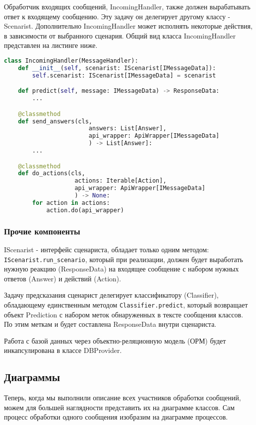     Обработчик входящих сообщений, IncomingHandler, также должен вырабатывать ответ
    к входящему сообщению. Эту задачу он делегирует другому классу - Scenarist.
    Дополнительно IncomingHandler может исполнять некоторые действия,
    в зависимости от выбранного сценария.
    Общий вид класса IncomingHandler представлен на листинге ниже.
\begin{lstlisting}[language=Python]
class IncomingHandler(MessageHandler):
    def __init__(self, scenarist: IScenarist[IMessageData]):
        self.scenarist: IScenarist[IMessageData] = scenarist

    def predict(self, message: IMessageData) -> ResponseData:
        ...

    @classmethod
    def send_answers(cls,
                        answers: List[Answer],
                        api_wrapper: ApiWrapper[IMessageData]
                        ) -> List[Answer]:
        ...

    @classmethod
    def do_actions(cls,
                    actions: Iterable[Action], 
                    api_wrapper: ApiWrapper[IMessageData]
                    ) -> None:
        for action in actions:
            action.do(api_wrapper)
\end{lstlisting}

    \subsubsection*{Прочие компоненты}
    IScenarist - интерфейс сценариста, обладает только одним методом:\\
    \lstinline{IScenarist.run_scenario}, который при реализации, должен будет
    выработать нужную реакцию (ResponseData) на входящее сообщение с набором
    нужных ответов (Answer) и действий (Action).

    Задачу предсказания сценарист делегирует классификатору (Classifier),
    обладающему единственным методом \lstinline{Classifier.predict}, который
    возвращает объект Prediction с набором меток обнаруженных в тексте сообщения классов.
    По этим меткам и будет составлена ResponseData внутри сценариста.

    Работа с базой данных через объектно-реляционную модель (ОРМ) будет инкапсулирована
    в классе DBProvider.

    \subsection{Диаграммы}
    Теперь, когда мы выполнили описание всех участников обработки сообщений,
    можем для большей наглядности представить их на диаграмме классов. Сам процесс
    обработки одного сообщения изобразим на диаграмме процессов.


